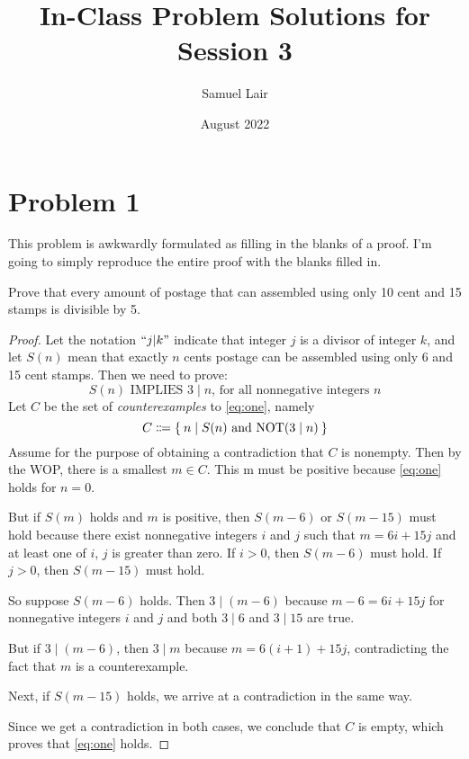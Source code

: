 \documentclass{article}
\title{In-Class Problem Solutions for Session 3}
\author{Samuel Lair}
\date{August 2022}
\begin{document}
\maketitle
\tableofcontents

\pagebreak

\section{Problem 1}
This problem is awkwardly formulated as filling in the blanks of a proof. I'm going to simply reproduce the entire proof with the blanks filled in.

Prove that every amount of postage that can assembled using only 10 cent and 15 stamps is divisible by 5.
\begin{proof}
	Let the notation $``j | k"$ indicate that integer $j$ is a divisor of integer $k$, and let $S(n)$ mean that exactly $n$ cents postage can be assembled using only 6 and 15 cent stamps. Then we need to prove:
	\begin{equation}\label{eq:one}
		S(n) \text{ IMPLIES } 3 \mid n \text{, for all nonnegative integers }n
	\end{equation}
	Let $C$ be the set of \textit{counterexamples} to \eqref{eq:one}, namely
	\[
		C \Coloneqq \Set{n | S(n) \text{ and NOT}(3 \mid n)}
	\]
	Assume for the purpose of obtaining a contradiction that $C$ is nonempty. Then by the WOP, there is a smallest $m \in C$. This m must be positive because \eqref{eq:one} holds for $n = 0$.

	But if $S(m)$ holds and $m$ is positive, then $S(m - 6)$ or $S(m-15)$ must hold because there exist nonnegative integers $i$ and $j$ such that $m = 6i + 15j$ and at least one of $i$, $j$ is greater than zero. If $i > 0$, then $S(m - 6)$ must hold. If $j > 0$, then $S(m - 15)$ must hold.

	So suppose $S(m - 6)$ holds. Then $3 \mid (m - 6)$ because $m - 6 = 6i + 15j$ for nonnegative integers $i$ and $j$ and both $3 \mid 6$ and $3 \mid 15$ are true.

	But if $3 \mid (m - 6)$, then $3 \mid m$ because $m = 6(i + 1) + 15j$, contradicting the fact that $m$ is a counterexample.

	Next, if $S(m - 15)$ holds, we arrive at a contradiction in the same way.

	Since we get a contradiction in both cases, we conclude that $C$ is empty, which proves that \eqref{eq:one} holds.
\end{proof}
\end{document}
